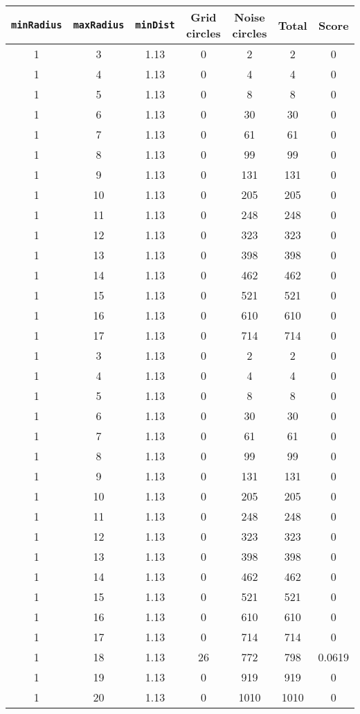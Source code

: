 \documentclass[letterpaper, 12pt]{article}
\begin{document}
\begin{longtable}{|c|c|c|c|c|c|c|}
\hline
\textbf{\texttt{minRadius}} & \textbf{\texttt{maxRadius}} & \textbf{\texttt{minDist}} & \textbf{Grid circles} & \textbf{Noise circles} & \textbf{Total} & \textbf{Score} \\
\hline
1 & 3 & 1.13 & 0 & 2 & 2 & 0 \\
\hline
1 & 4 & 1.13 & 0 & 4 & 4 & 0 \\
\hline
1 & 5 & 1.13 & 0 & 8 & 8 & 0 \\
\hline
1 & 6 & 1.13 & 0 & 30 & 30 & 0 \\
\hline
1 & 7 & 1.13 & 0 & 61 & 61 & 0 \\
\hline
1 & 8 & 1.13 & 0 & 99 & 99 & 0 \\
\hline
1 & 9 & 1.13 & 0 & 131 & 131 & 0 \\
\hline
1 & 10 & 1.13 & 0 & 205 & 205 & 0 \\
\hline
1 & 11 & 1.13 & 0 & 248 & 248 & 0 \\
\hline
1 & 12 & 1.13 & 0 & 323 & 323 & 0 \\
\hline
1 & 13 & 1.13 & 0 & 398 & 398 & 0 \\
\hline
1 & 14 & 1.13 & 0 & 462 & 462 & 0 \\
\hline
1 & 15 & 1.13 & 0 & 521 & 521 & 0 \\
\hline
1 & 16 & 1.13 & 0 & 610 & 610 & 0 \\
\hline
1 & 17 & 1.13 & 0 & 714 & 714 & 0 \\
\hline
1 & 3 & 1.13 & 0 & 2 & 2 & 0 \\
\hline
1 & 4 & 1.13 & 0 & 4 & 4 & 0 \\
\hline
1 & 5 & 1.13 & 0 & 8 & 8 & 0 \\
\hline
1 & 6 & 1.13 & 0 & 30 & 30 & 0 \\
\hline
1 & 7 & 1.13 & 0 & 61 & 61 & 0 \\
\hline
1 & 8 & 1.13 & 0 & 99 & 99 & 0 \\
\hline
1 & 9 & 1.13 & 0 & 131 & 131 & 0 \\
\hline
1 & 10 & 1.13 & 0 & 205 & 205 & 0 \\
\hline
1 & 11 & 1.13 & 0 & 248 & 248 & 0 \\
\hline
1 & 12 & 1.13 & 0 & 323 & 323 & 0 \\
\hline
1 & 13 & 1.13 & 0 & 398 & 398 & 0 \\
\hline
1 & 14 & 1.13 & 0 & 462 & 462 & 0 \\
\hline
1 & 15 & 1.13 & 0 & 521 & 521 & 0 \\
\hline
1 & 16 & 1.13 & 0 & 610 & 610 & 0 \\
\hline
1 & 17 & 1.13 & 0 & 714 & 714 & 0 \\
\hline
1 & 18 & 1.13 & 26 & 772 & 798 & 0.0619 \\
\hline
1 & 19 & 1.13 & 0 & 919 & 919 & 0 \\
\hline
1 & 20 & 1.13 & 0 & 1010 & 1010 & 0 \\
\hline
\end{longtable}
\end{document}
